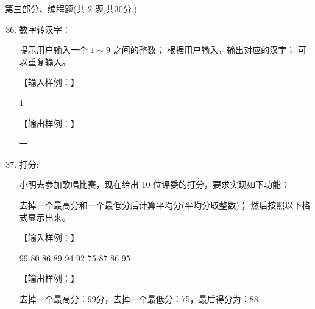 \documentclass[11pt]{ctexart}
\begin{document}
    \newpage
    {\noindent\heiti 第三部分、编程题(共 2 题,共30分.)}
    \begin{enumerate}
        \setcounter{enumi}{35}
        
        \item 数字转汉字：
        \begin{tasks}[label = (\arabic*)]
            \task 提示用户输入一个 $1\sim 9$ 之间的整数；
            \task 根据用户输入，输出对应的汉字；
            \task 可以重复输入。
        \end{tasks}
        【输入样例：】
        
        1

        【输出样例：】

        一
        \vfill

        \item 打分:
        
        小明去参加歌唱比赛，现在给出 10 位评委的打分，要求实现如下功能：
        \begin{tasks}[label = (\arabic*)]
            \task 去掉一个最高分和一个最低分后计算平均分(平均分取整数)；
            \task 然后按照以下格式显示出来。
        \end{tasks}
        【输入样例：】

        99 80 86 89 94 92 75 87 86 95

        【输出样例：】

        去掉一个最高分：99分，去掉一个最低分：75，最后得分为：88
        \vfill
    \end{enumerate}
\end{document}
